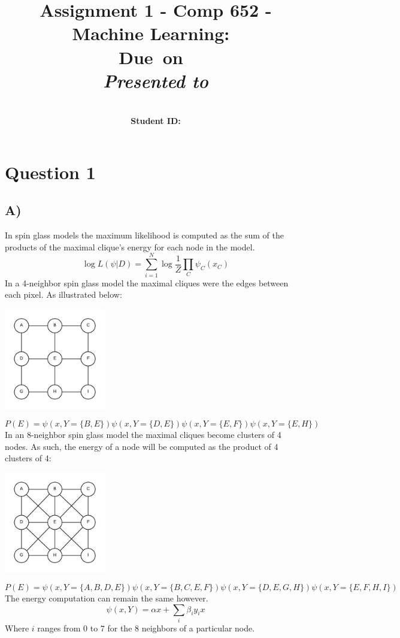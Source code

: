 \documentclass{report}
\title{Assignment 1 - Comp 652 - Machine Learning}
\title{\vspace{2in}\textmd{\textbf{\hmwkClass:\ \hmwkTitle}}\\
\normalsize\vspace{0.1in}\small{Due\ on\ \hmwkDueDate}\\
\vspace{0.1in}\large{\textit{Presented to \hmwkClassInstructor}}\vspace{3in}}
\date{}
\author{\textbf{\hmwkAuthorName}\\
    \textbf{Student ID: \hmwkAuthorNumber}}
\begin{document}
\maketitle
\section*{Question 1}
\subsection*{A)}
In spin glass models the maximum likelihood is computed as the sum of the products
of the maximal clique's energy for each node in the model.
\begin{equation}
  \log L(\psi | D) = \sum_{i=1}^N \log \frac{1}{Z} \prod_C \psi_C(x_C)
\end{equation}
In a 4-neighbor spin glass model the maximal cliques were the edges between
each pixel. As illustrated below:
\begin{center}
  \includegraphics[width=125pt, keepaspectratio=true]{ising_model_4n.jpg}\\
\end{center}
\begin{equation}
  P(E) = \psi (x, Y = \{B,E\}) \psi (x, Y = \{D,E\}) \psi (x, Y = \{E,F\}) \psi (x, Y = \{E,H\})
\end{equation}
In an 8-neighbor spin glass model the maximal cliques become
clusters of 4 nodes. As such, the energy of a node will be computed as the
product of 4 clusters of 4:
\begin{center}
  \includegraphics[width=125pt, keepaspectratio=true]{ising_model_8n.jpg}\\
\end{center}
\begin{equation}
  P(E) = \psi (x, Y = \{A,B,D,E\}) \psi (x, Y = \{B,C,E,F\}) \psi (x, Y = \{D,E,G,H\}) \psi (x, Y = \{E,F,H,I\})
\end{equation}
The energy computation can remain the same however.
\begin{equation}
  \psi(x, Y) = \alpha x + \sum_{i} \beta_{i} y_i x
\end{equation}
Where $i$ ranges from $0$ to $7$ for the 8 neighbors of a particular node.
\end{document}
